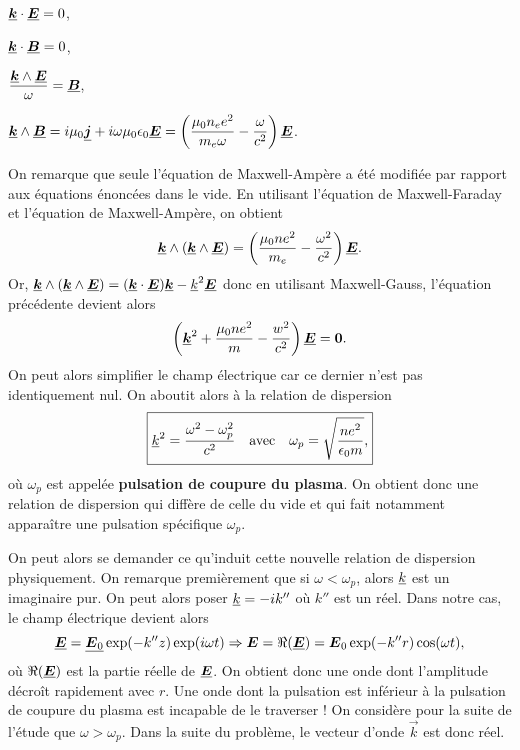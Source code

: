 \begin{description}[labelindent=2em, itemsep=1em]
	\item[Maxwell-Gauss : ]
	 $\complex{\vec{k}} \cdot \complex{\vece} = 0$,
	\item[Maxwell-Thomson : ]
	 $\complex{\vec{k}} \cdot \complex{\vecb} = 0$,
	\item[Maxwell-Faraday : ]
	$\dfrac{\complex{\vec{k}} \wedge \complex{\vece}}{\omega} = \complex{\vecb}$,
	\item[Maxwell-Ampère : ]
		$\complex{\vec{k}} \wedge \complex{\vecb} = i \mu_0 \complex{\vecj}
		+ i \omega \mu_0 \epsilon_0 \complex{\vece}
		= \left(\dfrac{\mu_0 n_e e^2}{m_e \omega} - \dfrac{\omega}{c^2} \right)
		\complex{\vece}$.
\end{description}
On remarque que seule l'équation de Maxwell-Ampère a été modifiée par rapport
aux équations énoncées dans le vide. En utilisant l'équation de Maxwell-Faraday
et l'équation de Maxwell-Ampère, on obtient
\begin{equation*}
	\complex{\vec{k}} \wedge (\complex{\vec{k}} \wedge \complex{\vece})
	= \left(\dfrac{\mu_0 n e^2}{m_e} - \dfrac{\omega^2}{c^2} \right)
	\complex{\vece}.
\end{equation*}
Or, $\complex{\vec{k}} \wedge (\complex{\vec{k}} \wedge \complex{\vece}) = 
(\complex{\vec{k}} \cdot \complex{\vece}) \complex{\vec{k}} - \complex{k}^2
\complex{\vece}$ donc en utilisant Maxwell-Gauss, l'équation précédente devient alors
\begin{equation*}
	\left(\complex{\vec{k}}^2 + \dfrac{\mu_0 n e^2}{m} - \dfrac{w^2}{c^2}\right)
	\complex{\vece} = \vec{0}.
\end{equation*}
On peut alors simplifier le champ électrique car ce dernier n'est pas identiquement
nul. On aboutit alors à la relation de dispersion
\begin{equation}
	\boxed{
	\underline{k}^2 = \dfrac{\omega^2 - \omega_p^2}{c^2}
	\quad \mathrm{avec} \quad \omega_p = \sqrt{\dfrac{n e^2}{\epsilon_0 m}},
}
	\label{eq:plasma}
\end{equation}
où $\omega_p$ est appelée \textbf{pulsation de coupure du plasma}. On obtient 
donc une relation de dispersion qui diffère de celle du vide et qui fait notamment
apparaître une pulsation spécifique $\omega_p$. 

On peut alors se demander ce qu'induit
cette nouvelle relation de dispersion physiquement. On remarque premièrement que si $\omega
< \omega_p$, alors $\underline{k}$ est un imaginaire pur. On peut alors poser 
$\underline{k} = -i k''$ où $k''$ est un réel. Dans notre cas, le champ électrique
devient alors 
\begin{equation*}
	\complex{\vece} = \complex{\vece_0}\exp(-k''z)\exp(i \omega t)
	\Rightarrow \vece = \Re(\complex{\vece}) = \vece_0 \exp(-k''r)\cos(\omega t),
\end{equation*}
où $\Re(\complex{\vece})$ est la partie réelle de $\complex{\vece}$. On obtient
donc une onde dont l'amplitude décroît rapidement avec $r$. Une onde dont la 
pulsation est inférieur à la pulsation de coupure du plasma est incapable de le 
traverser ! On considère pour la suite de l'étude que $\omega > \omega_p$. 
Dans la suite du problème, le vecteur d'onde $\vec{k}$ est donc réel.

